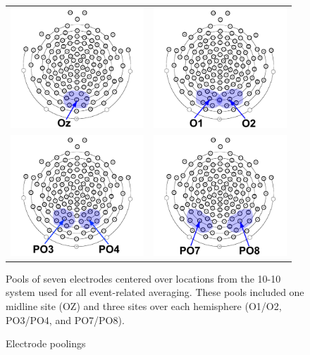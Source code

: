 \documentclass[dwyatte_dissertation.tex]{subfiles}
\begin{document}
\begin{figure}[h!]
\begin{center}
\begin{tabular}{ll}
\includegraphics[width=50mm]{figs/pleast/channels_oz.pdf} & 
\includegraphics[width=50mm]{figs/pleast/channels_o1_o2.pdf} \\
\includegraphics[width=50mm]{figs/pleast/channels_po3_po4.pdf} & 
\includegraphics[width=50mm]{figs/pleast/channels_po7_po8.pdf} \\
\end{tabular}
\end{center}
\caption{Electrode poolings}{Pools of seven electrodes centered over locations from the 10-10 system used for all event-related averaging. These pools included one midline site (OZ) and three sites over each hemisphere (O1/O2, PO3/PO4, and PO7/PO8).}
\label{fig:channels}
\end{figure}
\end{document}
